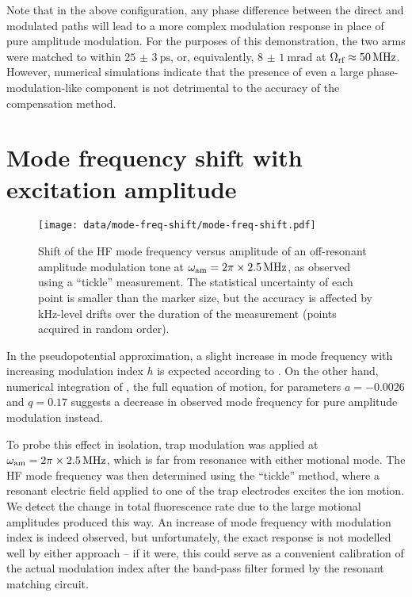 \documentclass[pra,twocolumn]{revtex4-2}
\begin{document}
Note that in the above configuration, any phase difference between the direct and modulated paths will lead to a more complex modulation response in place of pure amplitude modulation.
For the purposes of this demonstration, the two arms were matched to within $\SI{25(3)}{\pico\second}$, or, equivalently, $\SI{8(1)}{\milli\radian}$ at $\Omega_{\textrm{rf}} \approx \SI{50}{\mega\hertz}$.
However, numerical simulations indicate that the presence of even a large phase-modulation-like component is not detrimental to the accuracy of the compensation method.


\section{Mode frequency shift with excitation amplitude}
\label{sec:mode-freq-shift}

\begin{figure}
	\texttt{[image: data/mode-freq-shift/mode-freq-shift.pdf]}
	\caption{Shift of the HF mode frequency versus amplitude of an off-resonant amplitude modulation tone at $\omega_{\textrm{am}} = 2\pi \times \SI{2.5}{\mega\hertz}$, as observed using a \enquote{tickle} measurement. The statistical uncertainty of each point is smaller than the marker size, but the accuracy is affected by \si{\kilo\hertz}-level drifts over the duration of the measurement (points acquired in random order).}
	\label{fig:mode-freq-shift}
\end{figure}

In the pseudopotential approximation, a slight increase in mode frequency with increasing modulation index $h$ is expected according to .
On the other hand, numerical integration of , the full equation of motion, for parameters $a = -0.0026$ and $q = 0.17$ suggests a decrease in observed mode frequency for pure amplitude modulation instead.

To probe this effect in isolation, trap \RF{} modulation was applied at $\omega_{\textrm{am}} = 2\pi \times \SI{2.5}{\mega\hertz}$, which is far from resonance with either motional mode.
The HF mode frequency was then determined using the \enquote{tickle} method, where a resonant electric field applied to one of the trap electrodes excites the ion motion. We detect the change in total fluorescence rate due to the large motional amplitudes produced this way. An increase of mode frequency with modulation index is indeed observed, but unfortunately, the exact response is not modelled well by either approach – if it were, this could serve as a convenient calibration of the actual modulation index after the band-pass filter formed by the resonant matching circuit.
\end{document}
